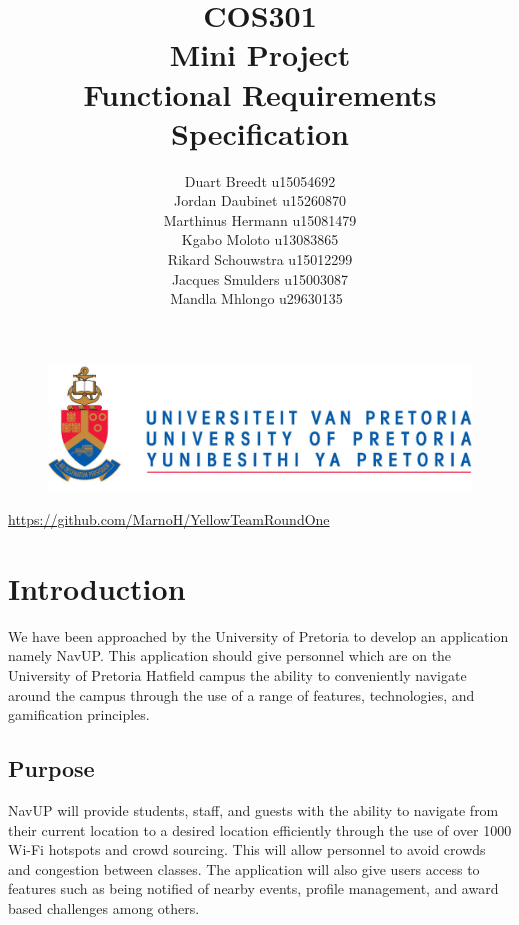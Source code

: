 \documentclass[12pt]{article}
\begin{document}
	

	\begin{figure}
		\includegraphics[width=\linewidth]{logo.jpg}	
	\end{figure}

	\title 	{
				COS301\\
				Mini Project\\
				Functional Requirements Specification
		   	}
	\author {
				Duart Breedt u15054692\\
				Jordan Daubinet u15260870\\
				Marthinus Hermann u15081479\\
				Kgabo Moloto u13083865\\
				Rikard Schouwstra u15012299\\
				Jacques Smulders u15003087\\
				Mandla Mhlongo u29630135\
			}
	\maketitle
	\begin{center}
			\url{https://github.com/MarnoH/YellowTeamRoundOne}	
	\end{center}
	\newpage
	\tableofcontents
	\newpage
	\section{Introduction}
		We have been approached by the University of Pretoria to develop an application namely NavUP. This application should give personnel which are on the University of Pretoria Hatfield campus the ability to conveniently navigate around the campus through the use of a range of features, technologies, and gamification principles.
		
	\subsection{Purpose}
		NavUP will provide students, staff, and guests with the ability to navigate from their current location to a desired location efficiently through the use of over 1000 Wi-Fi hotspots and crowd sourcing. This will allow personnel to avoid crowds and congestion between classes. The application will also give users access to features such as being notified of nearby events, profile management, and award based challenges among others.
		
\end{document}
